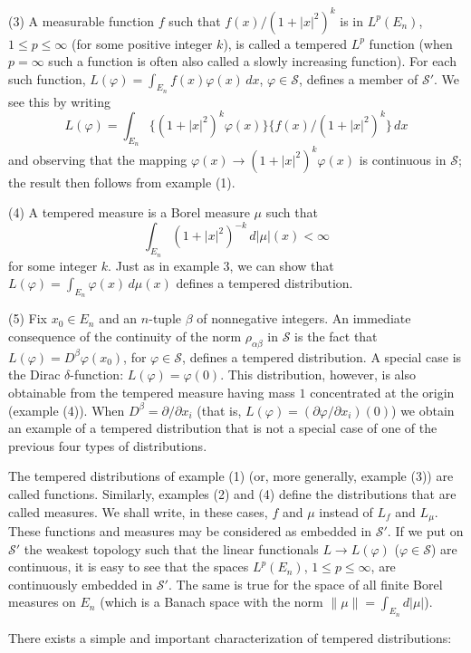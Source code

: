 \textup{(3)} A measurable function $f$ such that $f(x)/(1 + |x|^{2})^{k}$ is
in $L^{p}(E_{n})$, $1 \leq p \leq \infty$ (for some positive integer $k$), is
called a tempered $L^{p}$ function (when $p = \infty$ such a function is often
also called a slowly increasing function). For each such function,
$L(\varphi) = \int_{E_{n}} f(x)\varphi(x) \, dx$, $\varphi \in \mathscr{S}$,
defines a member of $\mathscr{S}'$. We see this by writing
\[
L(\varphi)=\int_{E_{n}}\{(1+|x|^{2})^{k}\varphi(x)\}\{f(x)/(1+|x|^{2})^{k}\}\,dx
\]
and observing that the mapping $\varphi(x) \to (1 + |x|^{2})^{k}\varphi(x)$ is
continuous in $\mathscr{S}$; the result then follows from example (1).

\textup{(4)} A tempered measure is a Borel measure $\mu$ such that
\[
\int_{E_{n}}(1+|x|^{2})^{-k}\,d|\mu|(x)<\infty
\]
for some integer $k$. Just as in example 3, we can show that
$L(\varphi) = \int_{E_{n}} \varphi(x) \, d\mu(x)$ defines a tempered
distribution.

\textup{(5)} Fix $x_{0} \in E_{n}$ and an $n$-tuple $\beta$ of nonnegative
integers. An immediate consequence of the continuity of the norm
$\rho_{\alpha\beta}$ in $\mathscr{S}$ is the fact that
$L(\varphi) = D^{\beta}\varphi(x_{0})$, for $\varphi \in \mathscr{S}$, defines
a tempered distribution. A special case is the Dirac $\delta$-function:
$L(\varphi) = \varphi(0)$. This distribution, however, is also obtainable from
the tempered measure having mass $1$ concentrated at the origin (example (4)).
When $D^{\beta} = \partial/\partial x_{i}$ (that is,
$L(\varphi) = (\partial\varphi/\partial x_{i})(0)$) we obtain an example of a
tempered distribution that is not a special case of one of the previous four
types of distributions.

The tempered distributions of example (1) (or, more generally, example (3))
are called functions. Similarly, examples (2) and (4) define the distributions
that are called measures. We shall write, in these cases, $f$ and $\mu$
instead of $L_{f}$ and $L_{\mu}$. These functions and measures may be
considered as embedded in $\mathscr{S}'$. If we put on $\mathscr{S}'$ the
weakest topology such that the linear functionals $L \to L(\varphi)$
($\varphi \in \mathscr{S}$) are continuous, it is easy to see that the spaces
$L^{p}(E_{n})$, $1 \leq p \leq \infty$, are continuously embedded in
$\mathscr{S}'$. The same is true for the space of all finite Borel measures on
$E_{n}$ (which is a Banach space with the norm $\|\mu\| = \int_{E_{n}} d|\mu|$).

There exists a simple and important characterization of tempered
distributions:

